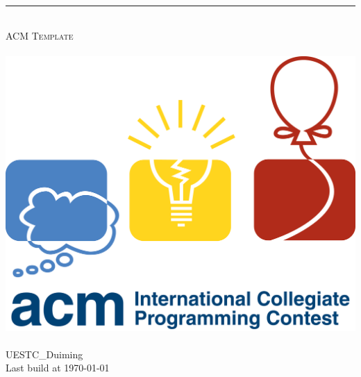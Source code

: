 \begin{titlepage}
	\pagestyle{empty}

  \begin{center}
		~\\[80pt]
    \hrule\ \\[8pt]
    \fontsize{48pt}{\baselineskip}\selectfont  \textsc{ACM Template}\\[8pt]
    ~\\[20pt]
    \includegraphics[scale=0.14]{./icpc_logo.png}
    ~\\[20pt]
    \huge UESTC\_Duiming\\[8pt]
    \Large Last build at \today
  \end{center}
\end{titlepage}
\restoregeometry
